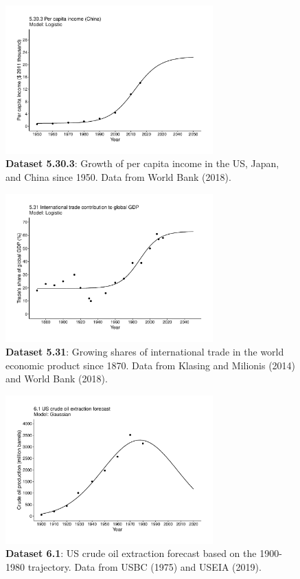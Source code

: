 \documentclass[aps,rmp,preprint,superscriptaddress,10pt,onecolumn]{article}
\begin{document}
\begin{figure}[h]
\includegraphics[width=8cm]{output/figs-ggplot/5.30.3.pdf}
\caption{\textbf{Dataset 5.30.3}: Growth of per capita income in the US, Japan, and China since 1950. Data from World Bank (2018).}
\end{figure}
	
\begin{figure}[h]
\includegraphics[width=8cm]{output/figs-ggplot/5.31.pdf}
\caption{\textbf{Dataset 5.31}: Growing shares of international trade in the world economic product since 1870. Data from Klasing and Milionis (2014) and World Bank (2018).}
\end{figure}
	
\begin{figure}[h]
\includegraphics[width=8cm]{output/figs-ggplot/6.1.pdf}
\caption{\textbf{Dataset 6.1}: US crude oil extraction forecast based on the 1900-1980 trajectory. Data from USBC (1975) and USEIA (2019). }
\end{figure}
	
\end{document}
